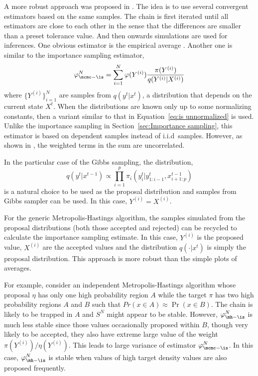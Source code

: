 

A more robust approach was proposed in \cite{Robert:1995ge}. The idea is to use several convergent estimators based on the same samples. The chain is first iterated until all estimators are close to each other in the sense that the differences are smaller than a preset tolerance value. And then onwards simulations are used for inferences. One obvious estimator is the empirical average . Another one is similar to the importance sampling estimator,
\begin{equation}
  \varphi_{\mcmc-\is}^N
  = \sum_{i=1}^N \varphi(Y^{(i)})\frac{\pi(Y^{(i)})}{q(Y^{(i)}|X^{(i)})}
  \label{eq:sn is}
\end{equation}
where $\{Y^{(i)}\}_{i=1}^N$ are samples from $q(y^t|x^t)$, a distribution that depends on the current state $X^t$. When the distributions are known only up to some normalizing constants, then a variant similar to that in Equation~\eqref{eq:is unnormalized} is used. Unlike the importance sampling in Section~\ref{sec:Importance sampling}, this estimator is based on dependent samples instead of i.i.d\ samples. However, as shown in \cite[][Lemma~12.11]{Robert:2004tn}, the weighted terms in the sum are uncorrelated.

In the particular case of the Gibbs sampling, the distribution,
\begin{equation}
  q(y^t|x^{t-1}) \propto
  \prod_{i=1}^p \pi_i(y_i^t|y_{1:i-1}^t,x_{i+1:p}^{t-1})
\end{equation}
is a natural choice to be used as the proposal distribution and samples from Gibbs sampler can be used. In this case, $Y^{(i)} = X^{(i)}$.

For the generic Metropolis-Hastings algorithm, the samples simulated from the proposal distributions (both those accepted and rejected) can be recycled to calculate the importance sampling estimate. In this case, $Y^{(i)}$ is the proposed value, $X^{(i)}$ are the accepted values and the distribution $q(\cdot|x^t)$ is simply the proposal distribution. This approach is more robust  than the simple plots of averages.

For example, consider an independent Metropolis-Hastings algorithm whose proposal $\eta$ has only one high probability region $A$ while the target $\pi$ has two high probability regions $A$ and $B$ such that $Pr(x\in A)\approx\Pr(x\in B)$. The chain is likely to be trapped in $A$ and $S^N$ might appear to be stable. However, $\varphi_{\mh-\is}^N$ is much less stable since those values occasionally proposed within $B$, though very likely to be accepted, they also have extreme large value of the weight $\pi(Y^{(i)})/\eta(Y^{(i)})$. This leads to  large variance of estimator $\varphi_{\mcmc-\is}^N$. In this case, $\varphi_{\mh-\is}^N$ is stable when values of high target density values are also proposed frequently.

